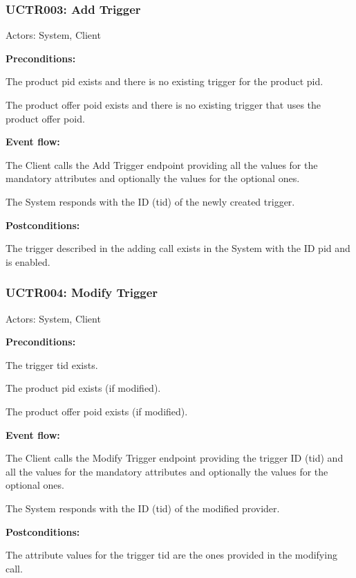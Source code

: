 \begin{ucbox}{\subsubsection{UCTR003: Add Trigger}}
\label{UCTR003}

Actors: System, Client

\textbf{Preconditions:}

\ucitem The product pid exists and there is no existing trigger for the product pid.

\ucitem The product offer poid exists and there is no existing trigger that uses the product offer poid.

\textbf{Event flow:}

\ucitem The Client calls the Add Trigger endpoint providing all the values for the mandatory attributes and optionally the values for the optional ones.

\ucitem The System responds with the ID (tid) of the newly created trigger.

\textbf{Postconditions:}

\ucitem The trigger described in the adding call exists in the System with the ID pid and is enabled.

\end{ucbox}

\begin{ucbox}{\subsubsection{UCTR004: Modify Trigger}}
\label{UCTR004}

Actors: System, Client

\textbf{Preconditions:}

\ucitem The trigger tid exists.

\ucitem The product pid exists (if modified).

\ucitem The product offer poid exists (if modified).

\textbf{Event flow:}

\ucitem The Client calls the Modify Trigger endpoint providing the trigger ID (tid) and all the values for the mandatory attributes and optionally the values for the optional ones.

\ucitem The System responds with the ID (tid) of the modified provider.

\textbf{Postconditions:}

\ucitem The attribute values for the trigger tid are the ones provided in the modifying call.

\end{ucbox}

